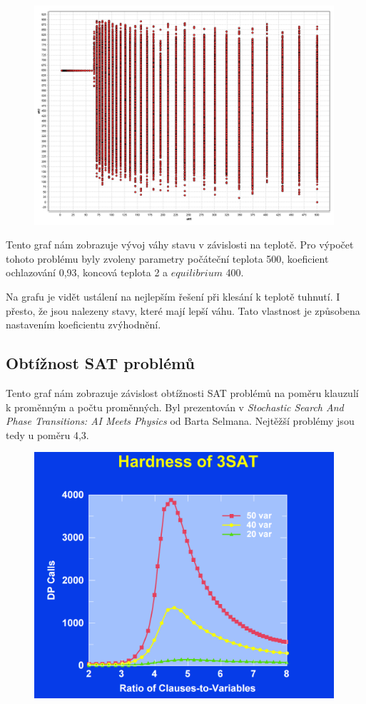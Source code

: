 \documentclass[10pt,a4paper]{article}
\begin{document}
\begin{figure}[H]\centering
 \includegraphics[width=0.99\textwidth]{weight_development}
\end{figure}

Tento graf nám zobrazuje vývoj váhy stavu v závislosti na teplotě. Pro výpočet tohoto problému byly zvoleny parametry počáteční teplota 500, koeficient ochlazování 0,93, koncová teplota 2 a $equilibrium$ 400.

Na grafu je vidět ustálení na nejlepším řešení  při klesání k teplotě tuhnutí. I přesto, že jsou nalezeny stavy, které mají lepší váhu. Tato vlastnost je způsobena nastavením koeficientu zvýhodnění.

\subsection{Obtížnost SAT problémů}
Tento graf nám zobrazuje závislost obtížnosti SAT problémů na poměru klauzulí k proměnným a počtu proměnných. Byl prezentován v \emph{Stochastic Search And
Phase Transitions: AI Meets Physics} od Barta Selmana. Nejtěžší problémy jsou tedy u poměru 4,3.
\begin{figure}[H]\centering
 \includegraphics[width=0.99\textwidth]{sat_hardness}
 \label{hardness}
\end{figure}
\end{document}
